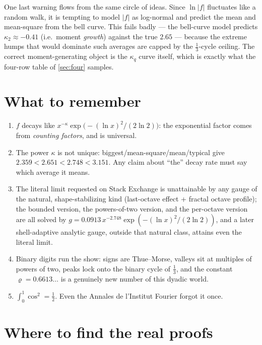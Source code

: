\documentclass[11pt,oneside]{article}
\theoremstyle{remark}
\begin{document}
One last warning flows from the same circle of ideas.  Since
$\ln|f|$ fluctuates like a random walk, it is tempting to model
$|f|$ as log-normal and predict the mean and mean-square from the
bell curve.  This fails badly --- the bell-curve model predicts
$\kappa_2\approx-0.41$ (i.e.\ moment \emph{growth}) against the true
$2.65$ --- because the extreme humps that would dominate such averages
are capped by the $\tfrac13$-cycle ceiling.  The correct
moment-generating object is the $\kappa_q$ curve itself, which is
exactly what the four-row table of \cref{sec:four} samples.

\section{What to remember}

\begin{enumerate}
\item $f$ decays like
$x^{-\kappa}\exp\bigl(-(\ln x)^2/(2\ln2)\bigr)$: the exponential
factor comes from \emph{counting factors}, and is universal.
\item The power $\kappa$ is not unique: biggest/mean-square/mean/typical
give $2.359<2.651<2.748<3.151$.  Any claim about ``the'' decay rate
must say which average it means.
\item The literal limit requested on Stack Exchange is unattainable
by any gauge of the natural, shape-stabilizing kind (last-octave
effect + fractal octave profile); the bounded version, the
powers-of-two version, and the per-octave version are all solved by
$g=0.0913\,x^{-2.748}\exp(-(\ln x)^2/(2\ln2))$, and a later
shell-adaptive analytic gauge, outside that natural class, attains
even the literal limit.
\item Binary digits run the show: signs are Thue--Morse, valleys sit
at multiples of powers of two, peaks lock onto the binary cycle of
$\tfrac13$, and the constant $\varrho=0.6613\ldots$ is a genuinely new
number of this dyadic world.
\item $\int_0^1\cos^2=\tfrac12$.  Even the Annales de l'Institut
Fourier forgot it once.
\end{enumerate}

\section{Where to find the real proofs}
\end{document}
